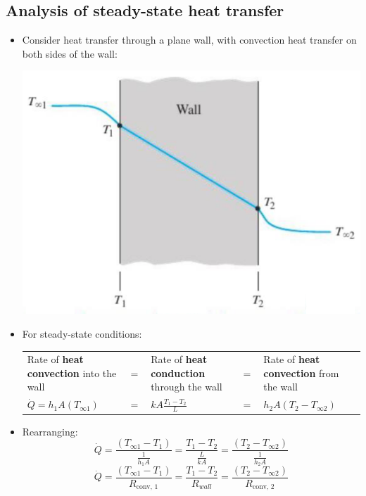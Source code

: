 \documentclass[11pt]{article}
\begin{document}
 \newpage

\subsection{Analysis of steady-state heat transfer}
\label{sec:orgad079a7}
\begin{itemize}
\item Consider heat transfer through a plane wall, with convection heat transfer on both sides of the wall:
\begin{center}
\includegraphics[width=.9\linewidth]{./images/analysis-of-steady-state-heat-transfer.png}
\end{center}
\item For steady-state conditions:
\begin{center}
\begin{tabular}{>{\centering\arraybackslash}m{10em} >{\centering\arraybackslash}m{1em} >{\centering\arraybackslash}m{10em} >{\centering\arraybackslash}m{1em} >{\centering\arraybackslash}m{10em}}
Rate of \textbf{heat convection} into the wall & \(=\) & Rate of \textbf{heat conduction} through the wall & \(=\) & Rate of \textbf{heat convection} from the wall\\[0pt]
\(\dot{Q} = h_1 A (T_{\infty 1})\) & \(=\) & \(kA \frac{T_1 - T_2}{L}\) & \(=\) & \(h_2 A (T_2 - T_{\infty 2})\)\\[0pt]
\end{tabular}
\end{center}
\item Rearranging:
\[\dot{Q} = \frac{(T_{\infty 1} - T_1)}{\frac{1}{h_1 A}} = \frac{T_1 - T_2}{\frac{L}{kA}} = \frac{(T_2 - T_{\infty 2})}{\frac{1}{h_2 A}}\]
\[\dot{Q} = \frac{(T_{\infty 1} - T_1)}{R_{\text{conv, 1}}} = \frac{T_1 - T_2}{R_{wall}} = \frac{(T_2 - T_{\infty 2})}{R_{\text{conv, 2}}}\]
\end{itemize}
\end{document}
